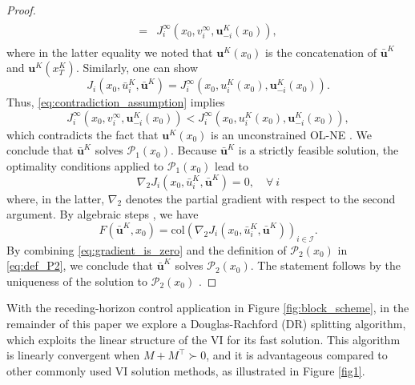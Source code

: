 \documentclass[letterpaper, 10 pt, conference]{ieeeconf}  %
\newcommand{\mc}{\mathcal}
\newcommand{\col}{\mathrm{col}}
\newcommand{\bu}{\boldsymbol{u}}
\begin{document}
\begin{proof}
\begin{align}
\begin{split}
        =& J_i^\infty(x_0,v_i^\infty, \bu^K_{-i}(x_0)),
    \end{split}
    \end{align}
    where in the latter equality we noted that $\bu^K(x_0)$ is the concatenation of $\bar{\bu}^K$ and $\bu^K(x^K_T)$. Similarly, one can show
    \begin{equation}
        J_i(x_0, \bar{u}_i^K, \bar{\bu}^K) = J_i^\infty(x_0, u^K_i(x_0), \bu_{-i}^K(x_0)).
    \end{equation}
    Thus, \eqref{eq:contradiction_assumption} implies 
    $$J_i^\infty(x_0,v_i^\infty, \bu^K_{-i}(x_0)) < J_i^\infty(x_0, u^K_{i}(x_0), \bu^K_{-i}(x_0)),$$
    which contradicts the fact that $\bu^K(x_0)$ is an unconstrained OL-NE \cite[Prop. 1]{benenati2024linear}. We conclude that $\bar{\bu}^K$ solves $\mc P_1(x_0)$. Because $\bar{\bu}^K$ is a strictly feasible solution, the optimality conditions applied to $\mc P_1(x_0)$ lead to
    \begin{equation}\label{eq:gradient_is_zero}
        \nabla_2 J_i(x_0, \bar{u}_i^K, \bar{\bu}^K)  = 0, \quad \forall ~i
    \end{equation}
    where, in the latter, $\nabla_{2}$ denotes the partial gradient with respect to the second argument. By algebraic steps \cite[Proof of Prop. 2]{benenati2024linear}, we have
    \begin{equation}
        F(\bar{\bu}^K, x_0) = \col(\nabla_{2} J_i(x_0, \bar{u}_i^K, \bar{\bu}^K))_{i\in\mc I}.
    \end{equation}
     By combining \eqref{eq:gradient_is_zero} and the definition of $\mc P_2(x_0)$ in \eqref{eq:def_P2}, we conclude that $\bar{\bu}^K$ solves $\mc P_2(x_0)$. The statement follows by the uniqueness of the solution to $\mc P_2(x_0)$ \cite[Prop. 2.3.2, Th. 2.3.3]{facchinei2003finite}.
    \end{proof}
    With the receding-horizon control application in Figure \ref{fig:block_scheme}, in the remainder of this paper we explore a Douglas-Rachford (DR) splitting algorithm, which exploits the linear structure of the VI for its fast solution. This algorithm is linearly convergent \cite[Proposition 6]{ferris1996operator} when $M+M^{\top}\succ 0$, and it is advantageous compared to other commonly used VI solution methods, as illustrated in Figure \ref{fig1}.

\end{document}
